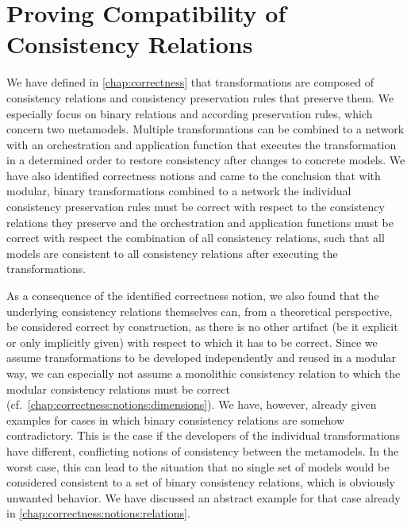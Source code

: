 \chapter{Proving Compatibility of Consistency Relations
}
\label{chap:compatibility}


We have defined in \autoref{chap:correctness} that transformations are composed of \glspl{consistency relation} and \glspl{consistency preservation rule} that preserve them.
We especially focus on binary relations and according preservation rules, which concern two metamodels.
Multiple transformations can be combined to a network with an orchestration and application function that executes the transformation in a determined order to restore consistency after changes to concrete models.
We have also identified correctness notions and came to the conclusion that with modular, binary transformations combined to a network the individual consistency preservation rules must be correct with respect to the consistency relations they preserve and the orchestration and application functions must be correct with respect the combination of all consistency relations, such that all models are consistent to all consistency relations after executing the transformations.

As a consequence of the identified correctness notion, we also found that the underlying consistency relations themselves can, from a theoretical perspective, be considered correct by construction, as there is no other artifact (be it explicit or only implicitly given) with respect to which it has to be correct.
Since we assume transformations to be developed independently and reused in a modular way, we can especially not assume a monolithic consistency relation to which the modular consistency relations must be correct (cf.\ \autoref{chap:correctness:notions:dimensions}).
We have, however, already given examples for cases in which binary consistency relations are somehow contradictory.
This is the case if the developers of the individual transformations have different, conflicting notions of consistency between the metamodels.
In the worst case, this can lead to the situation that no single set of models would be considered consistent to a set of binary consistency relations, which is obviously unwanted behavior.
We have discussed an abstract example for that case already in \autoref{chap:correctness:notions:relations}.

